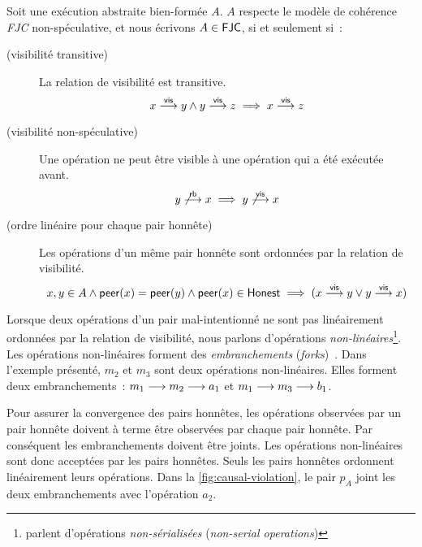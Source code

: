 \begin{definition}\label{def:fjc-consistency}
  Soit une exécution abstraite bien-formée $A$. $A$ respecte le modèle de cohérence \emph{\acf{FJC}} non-spéculative, et nous écrivons $A \in \operatorname{\mathsf{FJC}}$, si et seulement si~:

  \begin{description}
  \item[ (visibilité transitive)]
  La relation de visibilité est transitive.
  \begin{equation*}
    x \overset{\mathsf{vis}}{\longrightarrow} y \land y \overset{\mathsf{vis}}{\longrightarrow} z \implies x \overset{\mathsf{vis}}{\longrightarrow} z
  \end{equation*}

  \item[ (visibilité non-spéculative)]
  Une opération ne peut être visible à une opération qui a été exécutée avant.
  \begin{equation*}
    y \not\overset{\mathsf{rb}}{\longrightarrow} x \implies y \not\overset{\mathsf{vis}}{\longrightarrow} x
  \end{equation*}

  \item[ (ordre linéaire pour chaque pair honnête)]
  Les opérations d'un même pair honnête sont ordonnées par la relation de visibilité.
  \begin{equation*}
    x, y \in A \land \operatorname{\mathsf{peer}}(x) = \operatorname{\mathsf{peer}}(y) \land \operatorname{\mathsf{peer}}(x) \in \operatorname{\mathsf{Honest}} \implies (x \overset{\mathsf{vis}}{\longrightarrow} y \lor y \overset{\mathsf{vis}}{\longrightarrow} x)
  \end{equation*}
  \end{description}
\end{definition}

Lorsque deux opérations d'un pair mal-intentionné ne sont pas linéairement ordonnées par la relation de visibilité, nous parlons d'opérations \emph{non-linéaires}\footnote{\textcite{mahajan_2011_cac} parlent d'opérations \emph{non-sérialisées} (\emph{non-serial operations})}.
Les opérations non-linéaires forment des \emph{embranchements} (\emph{forks})~\autocite{li_2004_sundr}.
Dans l'exemple présenté, $m_2$ et $m_3$ sont deux opérations non-linéaires. Elles forment deux embranchements~: $m_1 \longrightarrow m_2 \longrightarrow a_1$ et $m_1 \longrightarrow m_3 \longrightarrow b_1$.

Pour assurer la convergence des pairs honnêtes, les opérations observées par un pair honnête doivent à terme être observées par chaque pair honnête.
Par conséquent les embranchements doivent être joints.
Les opérations non-linéaires sont donc acceptées par les pairs honnêtes.
Seuls les pairs honnêtes ordonnent linéairement leurs opérations.
Dans la \autoref{fig:causal-violation}, le pair $p_A$ joint les deux embranchements avec l'opération $a_2$.

